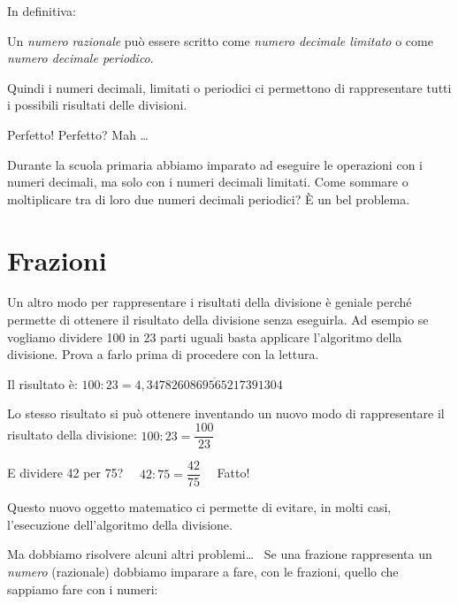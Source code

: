 In definitiva:

\begin{definizione}{}{}
 Un \emph{numero razionale} può essere scritto come \emph{numero decimale 
limitato} o come \emph{numero decimale 
periodico}.
\end{definizione}

Quindi i numeri decimali, limitati o periodici ci permettono di 
rappresentare tutti i possibili risultati delle divisioni.

Perfetto! \quad Perfetto? Mah \dots

Durante la scuola primaria abbiamo imparato ad eseguire le operazioni con i 
numeri decimali, ma solo con i numeri decimali limitati. Come 
sommare o moltiplicare tra di loro due numeri decimali periodici? È un bel 
problema.


\section{Frazioni}
\label{sec:razionali_frazioni}

Un altro modo per rappresentare i risultati della divisione è geniale 
perché permette di ottenere il risultato della divisione senza eseguirla. 
Ad esempio se vogliamo dividere 100 in 23 parti uguali basta applicare 
l'algoritmo della divisione. Prova a farlo prima di procedere con la 
lettura.

Il risultato è:
\(100 : 23 = 4,\overline{3478260869565217391304}\)

Lo stesso risultato si può ottenere inventando un nuovo modo di 
rappresentare il risultato della divisione:
\(100 : 23 = \dfrac{100}{23}\)

E dividere 42 per 75?
\(\quad 42 : 75 = \dfrac{42}{75} \quad\)
Fatto!

Questo nuovo oggetto matematico ci permette di evitare, in molti casi, 
l'esecuzione dell'algoritmo della divisione.

Ma dobbiamo risolvere alcuni altri problemi\dots~ 
Se una frazione rappresenta un \emph{numero} (razionale) dobbiamo imparare 
a fare, con le frazioni, quello che sappiamo fare con i numeri:

